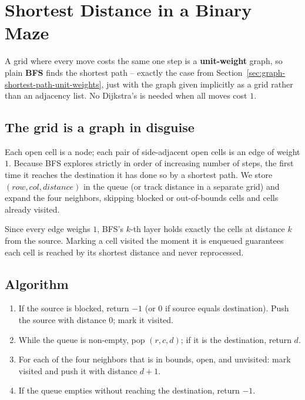 \section{Shortest Distance in a Binary Maze}
\label{sec:graph-shortest-binary-maze}


\begin{patternbox}
A grid where every move costs the same one step is a
\textbf{unit-weight} graph, so plain \textbf{BFS} finds the shortest
path -- exactly the case from
Section~\ref{sec:graph-shortest-path-unit-weights}, just with the
graph given implicitly as a grid rather than an adjacency list. No
Dijkstra's is needed when all moves cost $1$.
\end{patternbox}

\subsection*{The grid is a graph in disguise}

Each open cell is a node; each pair of side-adjacent open cells is an
edge of weight $1$. Because BFS explores strictly in order of increasing
number of steps, the first time it reaches the destination it has done
so by a shortest path. We store $(\textit{row},\textit{col},
\textit{distance})$ in the queue (or track distance in a separate grid)
and expand the four neighbors, skipping blocked or out-of-bounds cells
and cells already visited.

\begin{ideabox}
Since every edge weighs $1$, BFS's $k$-th layer holds exactly the cells
at distance $k$ from the source. Marking a cell visited the moment it is
enqueued guarantees each cell is reached by its shortest distance and
never reprocessed.
\end{ideabox}

\subsection*{Algorithm}

\begin{enumerate}
  \item If the source is blocked, return $-1$ (or $0$ if source equals
        destination). Push the source with distance $0$; mark it
        visited.
  \item While the queue is non-empty, pop $(r,c,d)$; if it is the
        destination, return $d$.
  \item For each of the four neighbors that is in bounds, open, and
        unvisited: mark visited and push it with distance $d+1$.
  \item If the queue empties without reaching the destination, return
        $-1$.
\end{enumerate}

